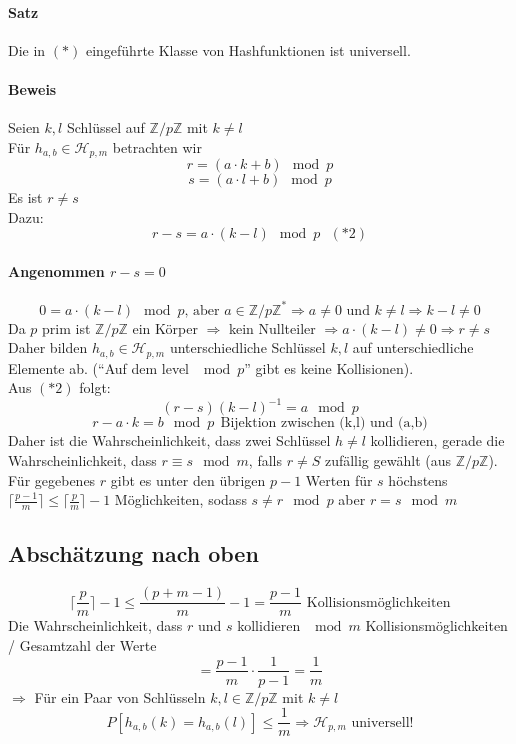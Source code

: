 \paragraph{Satz}
Die in $(*)$ eingeführte Klasse von Hashfunktionen ist universell.
\paragraph{Beweis}
Seien $k,l$ Schlüssel auf $\mathbb{Z}/p\mathbb{Z}$ mit $k\neq l$\\
Für $h_{a,b}\in \mathcal{H}_{p,m}$ betrachten wir
\[ r=(a\cdot k+b)\mod{p} \]
\[ s=(a\cdot l+b)\mod{p} \]
Es ist $r \neq s$\\
Dazu:
\[ r-s = a\cdot(k-l) \mod{p} ~~~(*2)\]
\paragraph{Angenommen $r-s=0$}
\[ 0=a\cdot(k-l)\mod{p}\text{, aber }a\in\mathbb{Z}/p\mathbb{Z}^* \Rightarrow a\neq 0\text{ und } k\neq l \Rightarrow k-l\neq 0 \]
Da $p$ prim ist $\mathbb{Z}/p\mathbb{Z}$ ein Körper $\Rightarrow$ kein Nullteiler $\Rightarrow a\cdot (k-l)\neq 0\Rightarrow r\neq s$\\
Daher bilden $h_{a,b}\in \mathcal{H}_{p,m}$ unterschiedliche Schlüssel $k,l$ auf unterschiedliche Elemente ab. ("`Auf dem level $\mod{p}$"' gibt es keine Kollisionen).\\
Aus $(*2)$ folgt:
\[ (r-s)(k-l)^{-1} = a\mod{p} \]
\[ r-a\cdot k = b\mod{p} ~~\text{Bijektion zwischen (k,l) und (a,b)}\]
Daher ist die Wahrscheinlichkeit, dass zwei Schlüssel $h\neq l$ kollidieren, gerade die Wahrscheinlichkeit, dass $r\equiv s \mod{m}$, falls $r\neq S$ zufällig gewählt (aus $\mathbb{Z}/p\mathbb{Z}$).\\
Für gegebenes $r$ gibt es unter den übrigen $p-1$ Werten für $s$ höchstens $\lceil \frac{p-1}{m} \rceil \leq \lceil \frac{p}{m} \rceil -1$ Möglichkeiten, sodass $s\neq r\mod{p}$ aber $r=s\mod{m}$
\subsection{Abschätzung nach oben}
\[\lceil \frac{p}{m} \rceil -1  \leq \frac{(p+m-1)}{m}-1 = \frac{p-1}{m} \text{ Kollisionsmöglichkeiten} \]
Die Wahrscheinlichkeit, dass $r$ und $s$ kollidieren $\mod{m}$ Kollisionsmöglichkeiten / Gesamtzahl der Werte
\[ =\frac{p-1}{m}\cdot\frac{1}{p-1}=\frac{1}{m} \]
$\Rightarrow$ Für ein Paar von Schlüsseln $k,l\in \mathbb{Z}/p\mathbb{Z}$ mit $k\neq l$
\[ P[h_{a,b}(k)=h_{a,b}(l)] \leq \frac{1}{m} \Rightarrow \mathcal{H}_{p,m} \text{ universell!} \]
